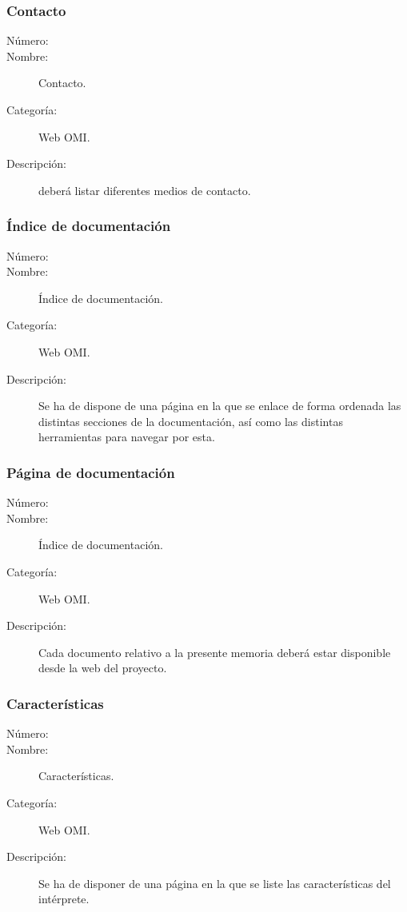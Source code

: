 \subsubsection{Contacto}
	\begin{description}
		\item [Número:] \cn
		\item [Nombre:] Contacto.
		\item [Categoría:] Web OMI.
		\item [Descripción:] deberá listar diferentes medios de contacto. 
	\end {description}

\subsubsection{Índice de documentación}
	\begin{description}
		\item [Número:] \cn
		\item [Nombre:] Índice de documentación.
		\item [Categoría:] Web OMI.
		\item [Descripción:]  Se ha de dispone de una página en la que se enlace de forma ordenada las distintas secciones de la 
      documentación, así como las distintas herramientas para navegar por esta.
	\end {description}

\subsubsection{Página de documentación}
	\begin{description}
		\item [Número:] \cn
		\item [Nombre:] Índice de documentación.
		\item [Categoría:] Web OMI.
		\item [Descripción:]  Cada documento relativo a la presente memoria deberá estar disponible desde la web del proyecto.
	\end {description}

\subsubsection{Características}
	\begin{description}
		\item [Número:] \cn
		\item [Nombre:] Características.
		\item [Categoría:] Web OMI.
		\item [Descripción:]  Se ha de disponer de una página en la que se liste las características del intérprete.
	\end {description}

